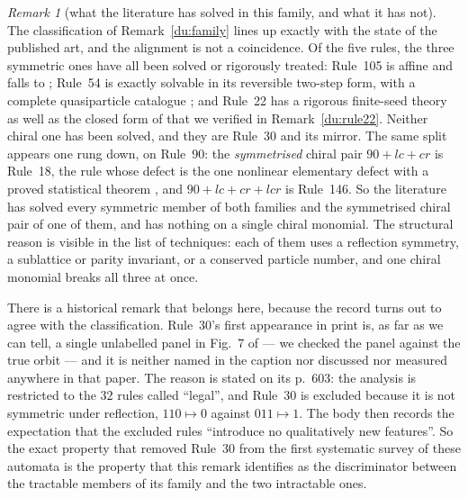\documentclass[11pt]{article}
\theoremstyle{definition}
\theoremstyle{remark}
\newtheorem{remark}[theorem]{Remark}
\begin{document}
\begin{remark}[what the literature has solved in this family, and what it has not]\label{du:chiraldisc}
The classification of Remark~\ref{du:family} lines up exactly with the state of the published art, and
the alignment is not a coincidence. Of the five rules, the three symmetric ones have all been solved or
rigorously treated: Rule~105 is affine and falls to \cite{MOW}; Rule~54 is exactly solvable in its
reversible two-step form, with a complete quasiparticle catalogue \cite{BKP}; and Rule~22 has a
rigorous finite-seed theory \cite{GG22} as well as the closed form of \cite{CLMR} that we verified in
Remark~\ref{du:rule22}. Neither chiral one has been solved, and they are Rule~30 and its mirror.
The same split appears one rung down, on Rule~90: the \emph{symmetrised} chiral pair
$90+lc+cr$ is Rule~18, the rule whose defect is the one nonlinear elementary defect with a proved
statistical theorem \cite{EN}, and $90+lc+cr+lcr$ is Rule~146. So the literature has solved every
symmetric member of both families and the symmetrised chiral pair of one of them, and has nothing on a
single chiral monomial. The structural reason is visible in the list of techniques: each of them uses a
reflection symmetry, a sublattice or parity invariant, or a conserved particle number, and one chiral
monomial breaks all three at once.

There is a historical remark that belongs here, because the record turns out to agree with the
classification. Rule~30's first appearance in print is, as far as we can tell, a single unlabelled
panel in Fig.~7 of \cite[p.~608]{W83} --- we checked the panel against the true orbit --- and it is
neither named in the caption nor discussed nor measured anywhere in that paper. The reason is stated on
its p.~603: the analysis is restricted to the $32$ rules called ``legal'', and Rule~30 is excluded
because it is not symmetric under reflection, $110\mapsto0$ against $011\mapsto1$. The body then
records the expectation that the excluded rules ``introduce no qualitatively new features''. So the
exact property that removed Rule~30 from the first systematic survey of these automata is the property
that this remark identifies as the discriminator between the tractable members of its
family and the two intractable ones.


\end{remark}
\end{document}
